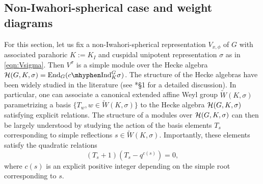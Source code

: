 \subsection{Non-Iwahori-spherical case and weight diagrams}\label{sec:weight_diagram}
For this section, let us fix a non-Iwahori-spherical representation $V_{x,\phi}$ of $G$ with associated parahoric $K:=K_I$ and cuspidal unipotent representation $\sigma$ as in \eqref{eqn:Vsigma}. Then $V^\sigma$ is a simple module over the Hecke algebra $\cH(G,K,\sigma)=\End_G(\cInd_K^G\sigma)$. The structure of the Hecke algebras have been widely studied in the literature (see \cite{Lusztig1995}*{\S 1} for a detailed discussion). In particular, one can associate a canonical extended affine Weyl group $\tilde W(K,\sigma)$ parametrizing a basis $\{T_w, w\in \tilde{W}(K,\sigma)\}$ to the Hecke algebra $\mathcal{H}(G,K,\sigma)$ satisfying explicit relations. The structure of a modules over $\mathcal{H}(G,K,\sigma)$ can then be largely understood by studying the action of the basis elements $T_s$ corresponding to simple reflections $s\in \tilde{W}(K,\sigma)$. Importantly, these elements satisfy the quadratic relations $$(T_s+1)(T_s-q^{c(s)})=0,$$
where $c(s)$ is an explicit positive integer depending on the simple root corresponding to $s$.

